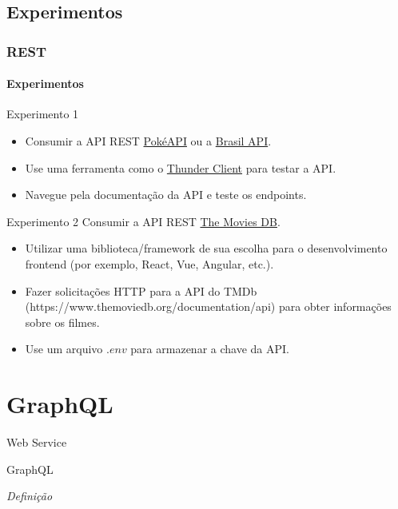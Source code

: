 \documentclass[
	9pt, %
	t, %
]{beamer}
\begin{document}
\subsection{Experimentos}

\begin{frame}
	\frametitle{REST}
	\framesubtitle{Experimentos}
	{\small
		\begin{block}{Experimento 1}
			\begin{itemize}
				\item Consumir a API REST \href{https://pokeapi.co/}{PokéAPI} ou a 
				      \href{https://brasilapi.com.br/docs}{Brasil API}.
				\item Use uma ferramenta como o \href{https://www.thunderclient.com/}{Thunder Client}
				      para testar a API.
				\item Navegue pela documentação da API e teste os endpoints.
			\end{itemize}
		\end{block}

		\begin{block}{Experimento 2}
			Consumir a API REST \href{https://www.themoviedb.org/}{The Movies DB}.
			\begin{itemize}
				\item Utilizar uma biblioteca/framework de sua escolha para o desenvolvimento
				      frontend (por exemplo, React, Vue, Angular, etc.).
				\item Fazer solicitações HTTP para a API do TMDb
				      (https://www.themoviedb.org/documentation/api) para obter informações sobre os
				      filmes.
				\item Use um arquivo $.env $ para armazenar a chave da API.
			\end{itemize}
		\end{block}
	}

\end{frame}

\section{GraphQL}

\begin{frame}
	\begin{center}

		\bigskip\bigskip\bigskip\bigskip %
		{\Large Web Service}

		\bigskip\bigskip %
		{\Huge GraphQL}

		\smallskip
		{\small \textit{Definição}}
	\end{center}

\end{frame}
\end{document}
